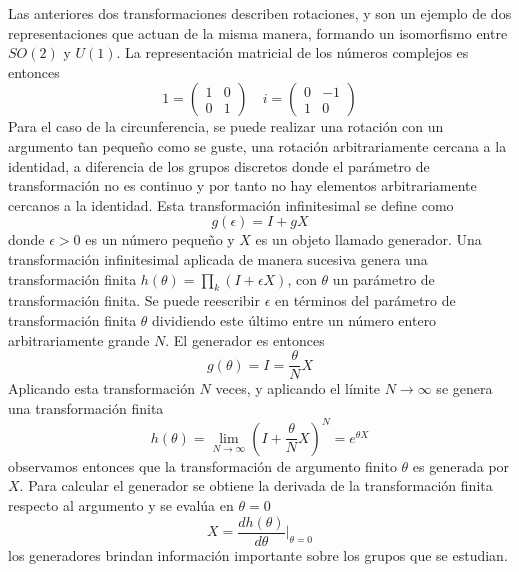 Las anteriores dos transformaciones describen rotaciones, y son un ejemplo de dos representaciones que actuan de la misma manera, formando un isomorfismo entre $SO(2)$ y $U(1)$. La representación matricial de los números complejos es entonces
\begin{equation*}
  1 = \begin{pmatrix}
    1 & 0 \\ 0 & 1
  \end{pmatrix} \quad i = \begin{pmatrix}
    0 & -1 \\ 1 & 0
  \end{pmatrix}
\end{equation*}
Para el caso de la circunferencia, se puede realizar una rotación con un argumento tan pequeño como se guste, una rotación arbitrariamente cercana a la identidad, a diferencia de los grupos discretos  donde el parámetro de transformación no es continuo y por tanto no hay elementos arbitrariamente cercanos a la identidad. Esta transformación infinitesimal se define como
\begin{equation*}
  g(\epsilon) = I + gX
\end{equation*}
donde $\epsilon>0$ es un número pequeño y $X$ es un objeto llamado generador. Una transformación infinitesimal aplicada de manera sucesiva genera una transformación finita $h(\theta) = \prod_k (I+\epsilon X)$, con $\theta$ un parámetro de transformación finita. Se puede reescribir $\epsilon$ en términos del parámetro de transformación finita $\theta$ dividiendo este último entre un número entero arbitrariamente grande $N$. El generador es entonces
\begin{equation*}
  g(\theta) = I = \frac{\theta}{N} X
\end{equation*}
Aplicando esta transformación $N$ veces, y aplicando el límite $N\to\infty$ se genera una transformación finita
\begin{equation*}
  h(\theta) = \lim_{N\to\infty}\left( I + \frac{\theta}{N}X \right)^N = e^{\theta X}
\end{equation*}
observamos entonces que la transformación de argumento finito $\theta$ es generada por $X$. Para calcular el generador se obtiene la derivada de la transformación finita respecto al argumento y se evalúa en $\theta=0$
\begin{equation}\label{eq:generator}
  X = \frac{dh(\theta)}{d\theta} \bigg|_{\theta=0}
\end{equation}
los generadores brindan información importante sobre los grupos que se estudian.
